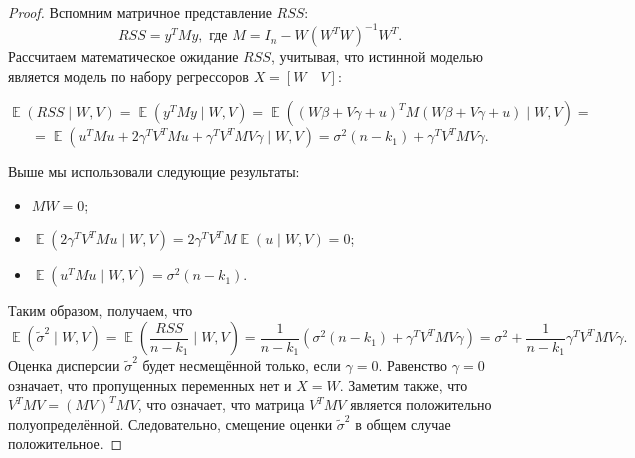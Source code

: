 \documentclass[12pt]{article}
\DeclareMathOperator{\Var}{\mathbb{V}ar}
\DeclareMathOperator{\E}{\mathbb{E}}
\newcommand{\hb}{\hat{\beta}}
\newcommand{\tb}{\tilde{\beta}}
\newcommand{\RSS}{RSS}
\begin{document}
\begin{proof}
Вспомним матричное представление $\RSS$:
\[
\RSS = y^{T}My, \text{ где } M = I_n - W(W^{T}W)^{-1}W^{T}.
\]
Рассчитаем математическое ожидание $\RSS$, учитывая, что истинной моделью является модель по набору регрессоров $X = [W \quad V]$:

\[
\E(\RSS \mid W,V) = \E(y^{T}My \mid W,V) = \E((W\beta + V\gamma + u)^{T}M(W\beta + V\gamma + u) \mid W,V) = 
\]
\[
=\E(u^{T}Mu + 2\gamma^{T}V^{T}Mu + \gamma^{T}V^{T}MV\gamma \mid W,V) = \sigma^2(n-k_1) + \gamma^{T}V^{T}MV\gamma.
\]

Выше мы использовали следующие результаты:
\begin{itemize}
    \item $MW = 0$;
    \item $\E(2\gamma^{T}V^{T}Mu \mid W,V) = 2\gamma^{T}V^{T}M\E(u \mid W,V) = 0$;
    \item  $\E (u^{T}Mu \mid W,V) = \sigma^2(n-k_1)$.
\end{itemize}

Таким образом, получаем, что 
\[
\E(\tilde\sigma^2 \mid W,V) = \E\left( \frac{RSS}{n-k_1}  \mid W,V\right) = \frac{1}{n-k_1} ( \sigma^2(n-k_1) + \gamma^{T}V^{T}MV\gamma ) = \sigma^2 + \frac{1}{n - k_1} \gamma^{T}V^{T}MV\gamma.
\]
Оценка дисперсии $\tilde\sigma^2$ будет несмещённой только, если $\gamma = 0$. 
Равенство $\gamma = 0$ означает, что пропущенных переменных нет и $X = W$.
Заметим также, что $V^{T}MV = (MV)^{T}MV$, что означает, что матрица $V^{T}MV$ является положительно полуопределённой. 
Следовательно, смещение оценки $\tilde\sigma^2$ в общем случае положительное.
\end{proof}
\begin{comment}
Что будет с эффективностью оценок, если пропущена часть важных регрессоров?
Ковариационная матрица оценок коэффициентов $\tilde{\b}$, полученная по сокращенному набору регрессоров $W$, имеет вид:
\[
\Var(\hb) = \sigma^2(X^{T}X)^{-1}.
\]

Вычислим ковариационную матрицу оценок коэффициентов $[\beta \,\,\,\, \gamma]^{T}$, полученную по полному набору регрессоров:
\[
\Var([\beta \,\,\,\, \gamma]^{T}) = \sigma^2([W \, V]^{T}[W \, V]).
\]

Применяя формулу блочного обращения матриц, получаем
\[
\Var(\tb) = \sigma^2 (W^{T}W - W^{T}V(V^{T}V)^{-1}V^{T}W)^{-1}.
\]

Рассмотрим разность двух ковариационных матриц:
\[
\Var(\hb) - \Var(\tb) = 
\]
\end{comment}
\end{document}
